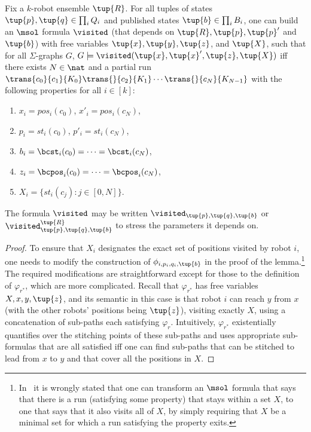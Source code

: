 \begin{lemma} \label{lem:visited}
Fix a $k$-robot ensemble $\tup{R}$. For all tuples of states $\tup{p},\tup{q} \in \prod_i Q_i$ and published states $\tup{b} \in \prod_i B_i$,
one can build an $\msol$ formula $\visited$ (that depends on $\tup{R},\tup{p},\tup{p}'$ and $\tup{b}$) with free variables 
$\tup{x}, \tup{y}, \tup{z}$, and $\tup{X}$, such that 
for all $\Sigma$-graphs $G$, $G \models \visited(\tup{x}, \tup{x}', \tup{z},\tup{X})$ iff there exists $N \in \nat$ and a partial run  
$\trans{c_0}{c_1}{K_0}\trans{}{c_2}{K_1} \cdots \trans{}{c_N}{K_{N-1}}$ with the following properties for all $i \in [k]$:
\begin{enumerate}
 \item $x_i = pos_i(c_0)$, $x'_i = pos_i(c_N)$,
 \item $p_i = st_i(c_0)$, $p'_i = st_i(c_N)$,
 \item $b_i = \bcst_i(c_0) = \dots = \bcst_i(c_N)$,
 \item $z_i = \bcpos_i(c_0) = \dots = \bcpos_i(c_N)$,
 \item $X_i = \{st_i(c_j) : j \in [0,N]\}$.
 \end{enumerate}
The formula $\visited$ may be written $\visited_{\tup{p},\tup{q},\tup{b}}$ or $\visited^{\tup{R}}_{\tup{p},\tup{q},\tup{b}}$ to stress the parameters it depends on.
\end{lemma}

\begin{proof}
To ensure that $X_i$ designates the exact set of positions
visited by robot $i$, one needs to modify the construction of $\phi_{i,p_i,q_i,\tup{b}}$ in the proof of the
lemma.\footnote{In~\cite{Rubin15AAMAS} it is wrongly stated that one can transform an
$\msol$ formula that says that there is a run (satisfying some property) that stays within a set
$X$, to one that says that it also visits all of $X$, by simply requiring that $X$ be a minimal
set for which a run satisfying the property exits.} The required modifications are
straightforward except for those to the definition of $\varphi_{r^*}$, which are more
complicated. Recall that $\varphi_{r^*}$ has free variables $X,x,y,\tup{z}$, and its
semantic in this case is that robot $i$ can reach $y$ from $x$ (with the other robots' positions
being $\tup{z}$), visiting exactly $X$, using a concatenation of sub-paths each satisfying
$\varphi_{r}$. Intuitively, $\varphi_{r^*}$ existentially quantifies over
the stitching points of these sub-paths and uses appropriate sub-formulas that are all
satisfied iff one can find sub-paths that can be stitched to lead from $x$ to $y$ and that cover
all the positions in $X$. 
\end{proof}


